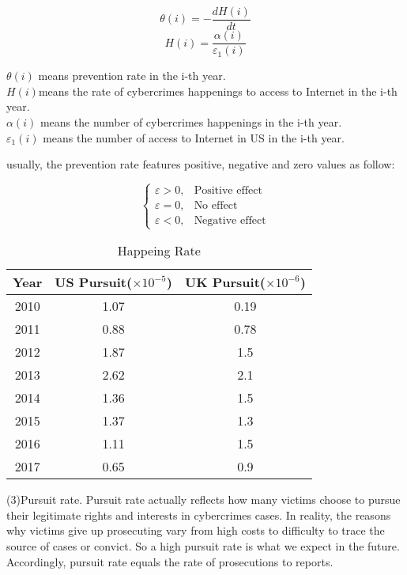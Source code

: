 \documentclass[12pt]{article}
\begin{document}
	 
	 
	 \[ \theta(i) = -\frac{dH(i)}{dt}\]
	 \[H(i)=\frac{\alpha(i)}{\varepsilon_1(i)}\]
	 \begin{center}
	 	$\theta(i)$ means prevention rate in the i-th year.\\
	 	$H(i)$means the rate of cybercrimes happenings to access to Internet in the i-th year.\\
	 	$\alpha(i)$ means the number of cybercrimes happenings in the i-th year.\\
	 	$\varepsilon_1(i)$ means the number of access to Internet in US in the i-th year.
	 \end{center}
 usually, the prevention rate features positive, negative and zero values as follow:
 
 \[
 \begin{cases}
 	\varepsilon > 0, & \text{Positive effect}\\
 	\varepsilon = 0, & \text{No effect}\\
 	\varepsilon < 0, & \text{Negative effect}
 \end{cases}
 \]
	 \begin{table}[H]
	 	\centering
	 	\caption{Happeing Rate}
	 	\label{tab:Happeing Rate}
	 	\begin{tabular}{|c|c|c|}
	 		
	 		\hline
	 		Year & US Pursuit($\times 10 ^{-5}$) & UK Pursuit($\times 10 ^{-6}$)\\
	 		\hline
	 		2010 & 1.07 & 0.19 \\
	 		\hline
	 		2011 & 0.88 & 0.78 \\
	 		\hline
	 		2012 & 1.87 & 1.5 \\
	 		\hline
	 		2013 & 2.62 & 2.1\\
	 		\hline
	 		2014& 1.36& 1.5\\
	 		\hline
	 		2015& 1.37 & 1.3\\
	 		\hline
	 		2016& 1.11 & 1.5\\
	 		\hline
	 		2017& 0.65 & 0.9\\
	 		\hline
	 		
	 	\end{tabular}
	 	
	 \end{table}
	 (3)Pursuit rate. Pursuit rate actually reflects how many victims choose to pursue their legitimate rights and interests in cybercrimes cases. In reality, the reasons why victims give up prosecuting vary from high costs to difficulty to trace the source of cases or convict. So a high pursuit rate is what we expect in the future. Accordingly, pursuit rate equals the rate of prosecutions to reports.
	 
\end{document}
